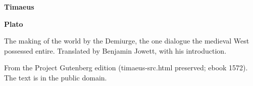 \documentclass[11pt,letterpaper]{article}
\begin{document}
\color{ink}

\begin{titlepage}
\centering
\vspace*{4em}
{\LARGE\bfseries\color{heading} Timaeus\par}
\vspace{2em}
{\Large\bfseries\color{heading} Plato\par}
\vspace{2.5em}
{\itshape\color{subhead}\parbox{0.8\linewidth}{\centering The making of the world by the Demiurge, the one dialogue the medieval West possessed entire. Translated by Benjamin Jowett, with his introduction.\par}}
\vfill
{\small From the Project Gutenberg edition (timaeus-src.html preserved; ebook 1572). The text is in the public domain.\par}
\vspace{2em}
\end{titlepage}

\tableofcontents


\end{document}
